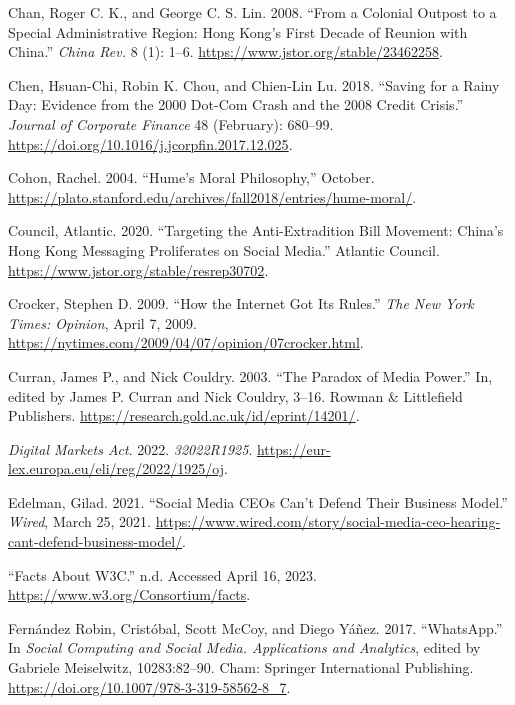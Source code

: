 \documentclass[
  a4paper,
]{book}
\newlength{\cslhangindent}
\newlength{\cslentryspacingunit} %
\newenvironment{CSLReferences}[2] %
 {%
  \setlength{\parindent}{0pt}
  \ifodd #1
  \let\oldpar\par
  \def\par{\hangindent=\cslhangindent\oldpar}
  \fi
  \setlength{\parskip}{#2\cslentryspacingunit}
 }%
 {}
\begin{document}
\begin{CSLReferences}{1}{0}
\hypertarget{ref-chanColonialOutpostSpecial2008}{}
Chan, Roger C. K., and George C. S. Lin. 2008. {``From a {Colonial Outpost} to a {Special Administrative Region}: {Hong Kong}'s {First Decade} of {Reunion} with {China}.''} \emph{China Rev.} 8 (1): 1--6. \url{https://www.jstor.org/stable/23462258}.

\hypertarget{ref-chenSavingRainyDay2018}{}
Chen, Hsuan-Chi, Robin K. Chou, and Chien-Lin Lu. 2018. {``Saving for a Rainy Day: {Evidence} from the 2000 Dot-Com Crash and the 2008 Credit Crisis.''} \emph{Journal of Corporate Finance} 48 (February): 680--99. \url{https://doi.org/10.1016/j.jcorpfin.2017.12.025}.

\hypertarget{ref-cohonHumeMoralPhilosophy2004}{}
Cohon, Rachel. 2004. {``Hume's {Moral Philosophy},''} October. \url{https://plato.stanford.edu/archives/fall2018/entries/hume-moral/}.

\hypertarget{ref-atlanticcouncilTargetingAntiExtraditionBill2020}{}
Council, Atlantic. 2020. {``Targeting the {Anti-Extradition Bill Movement}: {China}'s {Hong Kong Messaging Proliferates} on {Social Media}.''} {Atlantic Council}. \url{https://www.jstor.org/stable/resrep30702}.

\hypertarget{ref-crockerHowInternetGot2009}{}
Crocker, Stephen D. 2009. {``How the {Internet Got Its Rules}.''} \emph{The New York Times: Opinion}, April 7, 2009. \url{https://nytimes.com/2009/04/07/opinion/07crocker.html}.

\hypertarget{ref-curranParadoxMediaPower2003}{}
Curran, James P., and Nick Couldry. 2003. {``The Paradox of Media Power.''} In, edited by James P. Curran and Nick Couldry, 3--16. {Rowman \& Littlefield Publishers}. \url{https://research.gold.ac.uk/id/eprint/14201/}.

\hypertarget{ref-DigitalMarketsAct2022}{}
\emph{Digital {Markets Act}}. 2022. \emph{32022R1925}. \url{https://eur-lex.europa.eu/eli/reg/2022/1925/oj}.

\hypertarget{ref-edelmanSocialMediaCEOs2021}{}
Edelman, Gilad. 2021. {``Social {Media CEOs Can}'t {Defend Their Business Model}.''} \emph{Wired}, March 25, 2021. \url{https://www.wired.com/story/social-media-ceo-hearing-cant-defend-business-model/}.

\hypertarget{ref-FactsW3C}{}
{``Facts {About W3C}.''} n.d. Accessed April 16, 2023. \url{https://www.w3.org/Consortium/facts}.

\hypertarget{ref-fernandezrobinWhatsApp2017}{}
Fernández Robin, Cristóbal, Scott McCoy, and Diego Yáñez. 2017. {``{WhatsApp}.''} In \emph{Social {Computing} and {Social Media}. {Applications} and {Analytics}}, edited by Gabriele Meiselwitz, 10283:82--90. {Cham}: {Springer International Publishing}. \url{https://doi.org/10.1007/978-3-319-58562-8_7}.


\end{CSLReferences}
\end{document}
